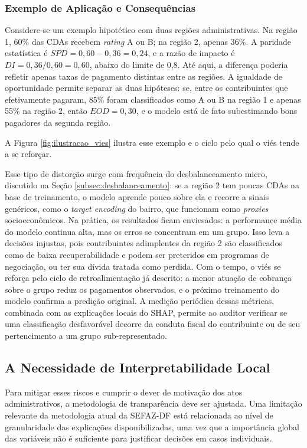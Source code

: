 \subsubsection{Exemplo de Aplicação e Consequências}
Considere-se um exemplo hipotético com duas regiões administrativas. Na região 1, 60\% das CDAs recebem \textit{rating} A ou B; na região 2, apenas 36\%. A paridade estatística é $SPD = 0{,}60 - 0{,}36 = 0{,}24$, e a razão de impacto é $DI = 0{,}36 / 0{,}60 = 0{,}60$, abaixo do limite de 0,8. Até aqui, a diferença poderia refletir apenas taxas de pagamento distintas entre as regiões. A igualdade de oportunidade permite separar as duas hipóteses: se, entre os contribuintes que efetivamente pagaram, 85\% foram classificados como A ou B na região 1 e apenas 55\% na região 2, então $EOD = 0{,}30$, e o modelo está de fato subestimando bons pagadores da segunda região.

A Figura \ref{fig:ilustracao_vies} ilustra esse exemplo e o ciclo pelo qual o viés tende a se reforçar.



Esse tipo de distorção surge com frequência do desbalanceamento micro, discutido na Seção \ref{subsec:desbalanceamento}: se a região 2 tem poucas CDAs na base de treinamento, o modelo aprende pouco sobre ela e recorre a sinais genéricos, como o \textit{target encoding} do bairro, que funcionam como \textit{proxies} socioeconômicos. Na prática, os resultados ficam enviesados: a performance média do modelo continua alta, mas os erros se concentram em um grupo. Isso leva a decisões injustas, pois contribuintes adimplentes da região 2 são classificados como de baixa recuperabilidade e podem ser preteridos em programas de negociação, ou ter sua dívida tratada como perdida. Com o tempo, o viés se reforça pelo ciclo de retroalimentação já descrito: a menor atuação de cobrança sobre o grupo reduz os pagamentos observados, e o próximo treinamento do modelo confirma a predição original. A medição periódica dessas métricas, combinada com as explicações locais do SHAP, permite ao auditor verificar se uma classificação desfavorável decorre da conduta fiscal do contribuinte ou de seu pertencimento a um grupo sub-representado.

\subsection{A Necessidade de Interpretabilidade Local}
Para mitigar esses riscos e cumprir o dever de motivação dos atos administrativos, a metodologia de transparência deve ser ajustada. Uma limitação relevante da metodologia atual da SEFAZ-DF está relacionada ao nível de granularidade das explicações disponibilizadas, uma vez que a importância global das variáveis não é suficiente para justificar decisões em casos individuais.

